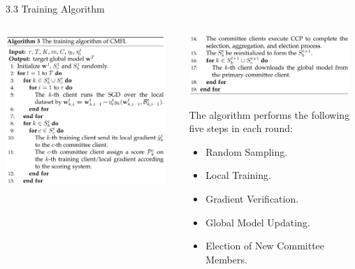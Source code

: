\documentclass{sintefbeamer}
\theoremstyle{definition}
\begin{document}
\begin{frame}{3.3 Training Algorithm}
\begin{columns}
\begin{column}{0.5\textwidth}
\includegraphics[width=0.95\textwidth]{images/algo_training1}
\end{column}
\begin{column}{0.45\textwidth}
\includegraphics[width=0.95\textwidth]{images/algo_training2}

The algorithm performs the following five steps in each round:
\begin{itemize}
\item[1)] Random Sampling.
\item[2)] Local Training.
\item[3)] Gradient Verification.
\item[4)] Global Model Updating.
\item[5)] Election of New Committee Members.
\end{itemize}

\end{column}
\end{columns}
\end{frame}
\end{document}
